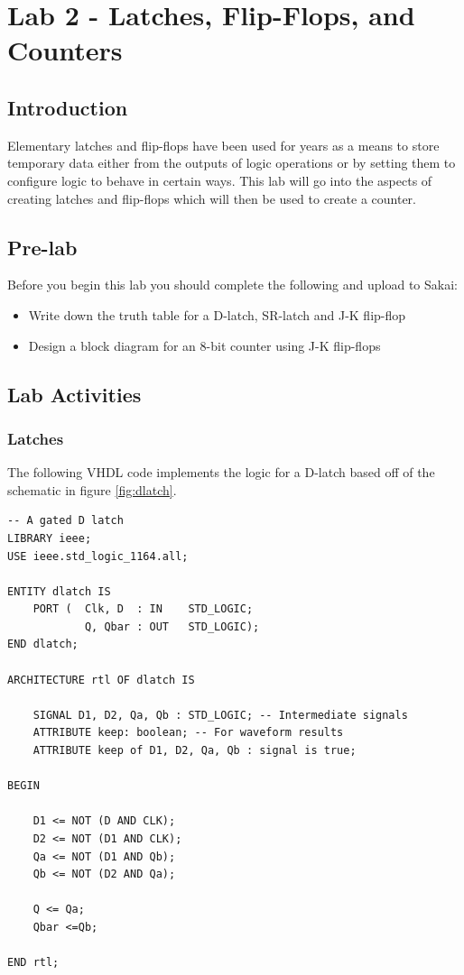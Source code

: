 \section{Lab 2 - Latches, Flip-Flops, and Counters}

\subsection{Introduction}
Elementary latches and flip-flops have been used for years as a means to store temporary data either from the outputs of logic operations or by setting them to configure logic to behave in certain ways. This lab will go into the aspects of creating latches and flip-flops which will then be used to create a counter. 

\subsection{Pre-lab}
Before you begin this lab you should complete the following and upload to Sakai:

\begin{itemize}
	\item Write down the truth table for a D-latch, SR-latch and J-K flip-flop
	\item Design a block diagram for an 8-bit counter using J-K flip-flops
\end{itemize} 

\subsection{Lab Activities}

\subsubsection{Latches}
The following VHDL code implements the logic for a D-latch based off of the schematic in figure \ref{fig:dlatch}. 

\begin{lstlisting}
-- A gated D latch
LIBRARY ieee;
USE ieee.std_logic_1164.all;

ENTITY dlatch IS
	PORT (	Clk, D	: IN	STD_LOGIC;
			Q, Qbar	: OUT	STD_LOGIC);
END dlatch;

ARCHITECTURE rtl OF dlatch IS

	SIGNAL D1, D2, Qa, Qb : STD_LOGIC; -- Intermediate signals
	ATTRIBUTE keep: boolean; -- For waveform results
	ATTRIBUTE keep of D1, D2, Qa, Qb : signal is true;
	
BEGIN
	
	D1 <= NOT (D AND CLK);
	D2 <= NOT (D1 AND CLK);
	Qa <= NOT (D1 AND Qb);
	Qb <= NOT (D2 AND Qa);

	Q <= Qa;
	Qbar <=Qb;
	
END rtl;
\end{lstlisting}


